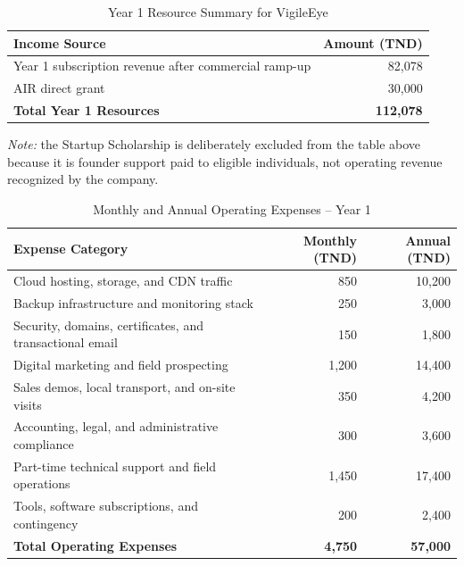 \documentclass[12pt,a4paper,oneside]{report}
\begin{document}
\begin{table}[!htbp]
\centering
\small
\begin{tabular}{|p{9.5cm}|r|}
\hline
\rowcolor{gray!20}
\textbf{Income Source} & \textbf{Amount (TND)} \\
\hline
Year 1 subscription revenue after commercial ramp-up & 82{,}078 \\
\hline
AIR direct grant & 30{,}000 \\
\hline
\rowcolor{gray!20}
\textbf{Total Year 1 Resources} & \textbf{112{,}078} \\
\hline
\end{tabular}
\caption{Year 1 Resource Summary for VigileEye}
\label{tab:vigileeye_income_appendix}
\end{table}

\hspace{0.8cm}\textit{Note:} the Startup Scholarship is deliberately excluded from the table above because it is founder support paid to eligible individuals, not operating revenue recognized by the company.

\begin{table}[!htbp]
\centering
\small
\begin{tabular}{|p{8.5cm}|r|r|}
\hline
\rowcolor{gray!20}
\textbf{Expense Category} & \textbf{Monthly (TND)} & \textbf{Annual (TND)} \\
\hline
Cloud hosting, storage, and CDN traffic & 850 & 10{,}200 \\
\hline
Backup infrastructure and monitoring stack & 250 & 3{,}000 \\
\hline
Security, domains, certificates, and transactional email & 150 & 1{,}800 \\
\hline
Digital marketing and field prospecting & 1{,}200 & 14{,}400 \\
\hline
Sales demos, local transport, and on-site visits & 350 & 4{,}200 \\
\hline
Accounting, legal, and administrative compliance & 300 & 3{,}600 \\
\hline
Part-time technical support and field operations & 1{,}450 & 17{,}400 \\
\hline
Tools, software subscriptions, and contingency & 200 & 2{,}400 \\
\hline
\rowcolor{gray!20}
\textbf{Total Operating Expenses} & \textbf{4{,}750} & \textbf{57{,}000} \\
\hline
\end{tabular}
\caption{Monthly and Annual Operating Expenses -- Year 1}
\label{tab:vigileeye_opex_appendix}
\end{table}
\end{document}
